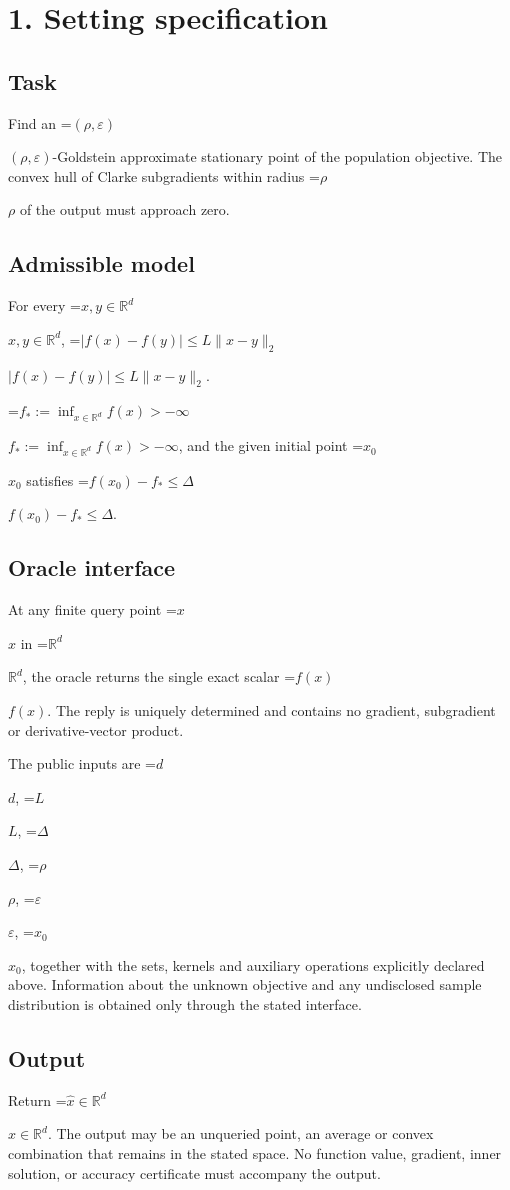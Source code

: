\documentclass[10pt,a4paper]{article}
\newcommand{\AtlasMath}[1]{\par\begingroup\centering\setbox0=\hbox{$\displaystyle #1$}\ifdim\wd0>1.4\linewidth\typeout{ATLAS WIDE FORMULA: \the\wd0}\fi\ifdim\wd0>\linewidth\resizebox{\linewidth}{!}{\box0}\else\box0\fi\par\endgroup}
\newcommand{\AtlasInlineMath}[1]{\begingroup\setbox0=\hbox{$#1$}\ifdim\wd0>.4\linewidth\endgroup\AtlasMath{#1}\else\endgroup$#1$\fi}
\begin{document}
\section{1. Setting specification}
\subsection{Task}
Find an \AtlasInlineMath{(\rho,\varepsilon)}-Goldstein approximate stationary point of the population objective. The convex hull of Clarke subgradients within radius \AtlasInlineMath{\rho} of the output must approach zero.

\subsection{Admissible model}
For every \AtlasInlineMath{x,y\in\mathbb{R}^d}, \AtlasInlineMath{|f(x)-f(y)|\le L\|x-y\|_2}.

\AtlasInlineMath{f_*:=\inf_{x\in\mathbb{R}^d}f(x)>-\infty}, and the given initial point \AtlasInlineMath{x_0} satisfies \AtlasInlineMath{f(x_0)-f_*\le\Delta}.

\subsection{Oracle interface}
At any finite query point \AtlasInlineMath{x} in \AtlasInlineMath{\mathbb{R}^d}, the oracle returns the single exact scalar \AtlasInlineMath{f(x)}. The reply is uniquely determined and contains no gradient, subgradient or derivative-vector product.

The public inputs are \AtlasInlineMath{d}, \AtlasInlineMath{L}, \AtlasInlineMath{\Delta}, \AtlasInlineMath{\rho}, \AtlasInlineMath{\varepsilon}, \AtlasInlineMath{x_0}, together with the sets, kernels and auxiliary operations explicitly declared above. Information about the unknown objective and any undisclosed sample distribution is obtained only through the stated interface.

\subsection{Output}
Return \AtlasInlineMath{\widehat{x}\in \mathbb{R}^d}. The output may be an unqueried point, an average or convex combination that remains in the stated space. No function value, gradient, inner solution, or accuracy certificate must accompany the output.
\end{document}
